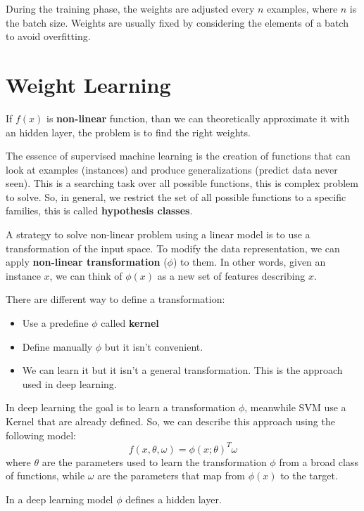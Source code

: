 \begin{note}
    During the training phase, the weights are adjusted every $n$ examples,
    where $n$ is the batch size. Weights are usually fixed by considering the
    elements of a batch to avoid overfitting.
\end{note}
\section{Weight Learning}
If $f(x)$ is \textbf{non-linear} function, than we can theoretically approximate
it with an hidden layer, the problem is to find the right weights.

The essence of supervised machine learning is the creation of functions that
can look at examples (instances) and produce generalizations (predict data never seen).
This is a searching task over all possible functions, this is complex problem to
solve. So, in general, we restrict the set of all possible functions to a specific
families, this is called \textbf{hypothesis classes}.

A strategy to solve non-linear problem using a linear model is to use a
transformation of the input space. To modify the data representation, we can
apply \textbf{non-linear transformation} ($\phi$) to them. In other words, given
an instance $x$, we can think of $\phi(x)$ as a new set of features describing $x$.

There are different way to define a transformation:
\begin{itemize}
    \item Use a predefine $\phi$ called \textbf{kernel}
    \item Define manually $\phi$ but it isn't convenient.
    \item We can learn it but it isn't a general transformation. This is the
          approach used in deep learning.
\end{itemize}

In deep learning the goal is to learn a transformation $\phi$, meanwhile SVM use
a Kernel that are already defined. So, we can describe this approach using the
following model:
\begin{equation}
    f(x, \theta, \omega) = \phi(x; \theta)^T \omega
\end{equation}
where $\theta$ are the parameters used to learn the transformation $\phi$ from a
broad class of functions, while $\omega$ are the parameters that map from $\phi(x)$
to the target.

\begin{note}
    In a deep learning model $\phi$ defines a hidden layer.
\end{note}

